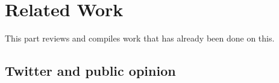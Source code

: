 \section{Related Work}
This part reviews and compiles work that has already been done on this.

\subsection{Twitter and public opinion}
